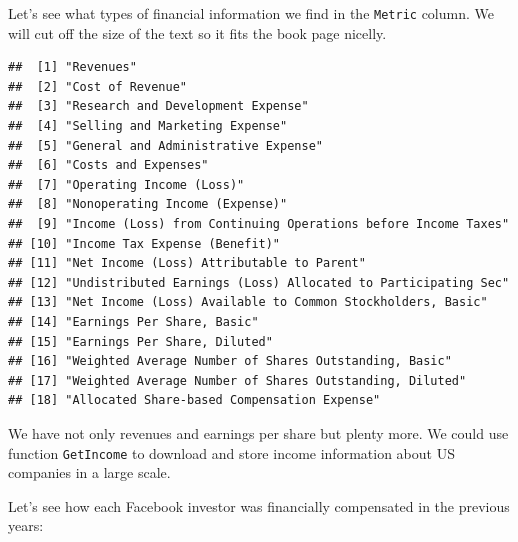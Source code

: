 \documentclass[11pt,]{book}
\newenvironment{Shaded}{\begin{snugshade}}{\end{snugshade}}
\newcommand{\KeywordTok}[1]{\textcolor[rgb]{0.27,0.27,0.27}{\textbf{#1}}}
\newcommand{\DecValTok}[1]{\textcolor[rgb]{0.06,0.06,0.06}{#1}}
\newcommand{\StringTok}[1]{\textcolor[rgb]{0.5,0.5,0.5}{#1}}
\newcommand{\CommentTok}[1]{\textcolor[rgb]{0.56,0.35,0.01}{\textit{#1}}}
\newcommand{\OperatorTok}[1]{\textcolor[rgb]{0.81,0.36,0.00}{\textbf{#1}}}
\newcommand{\NormalTok}[1]{#1}
\begin{document}
Let's see what types of financial information we find in the
\texttt{Metric} column. We will cut off the size of the text so it fits
the book page nicelly.

\begin{Shaded}
\end{Shaded}

\begin{verbatim}
##  [1] "Revenues"                                                    
##  [2] "Cost of Revenue"                                             
##  [3] "Research and Development Expense"                            
##  [4] "Selling and Marketing Expense"                               
##  [5] "General and Administrative Expense"                          
##  [6] "Costs and Expenses"                                          
##  [7] "Operating Income (Loss)"                                     
##  [8] "Nonoperating Income (Expense)"                               
##  [9] "Income (Loss) from Continuing Operations before Income Taxes"
## [10] "Income Tax Expense (Benefit)"                                
## [11] "Net Income (Loss) Attributable to Parent"                    
## [12] "Undistributed Earnings (Loss) Allocated to Participating Sec"
## [13] "Net Income (Loss) Available to Common Stockholders, Basic"   
## [14] "Earnings Per Share, Basic"                                   
## [15] "Earnings Per Share, Diluted"                                 
## [16] "Weighted Average Number of Shares Outstanding, Basic"        
## [17] "Weighted Average Number of Shares Outstanding, Diluted"      
## [18] "Allocated Share-based Compensation Expense"
\end{verbatim}

We have not only revenues and earnings per share but plenty more. We
could use function \texttt{GetIncome} to download and store income
information about US companies in a large scale.

Let's see how each Facebook investor was financially compensated in the
previous years:
\end{document}
